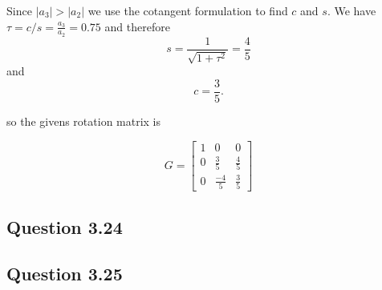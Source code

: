 \documentclass[12pt,a4paper]{report}
\begin{document}
Since $\lvert a_3 \rvert > \lvert a_2 \rvert$ we use the cotangent formulation
to find $c$ and $s$. We have $\tau = c / s = \frac{a_3}{a_2} = 0.75$ and
therefore
$$s = \frac{1}{\sqrt{1+ \tau^2}} =\frac{4}{5}$$
and
$$c = \frac{3}{5}.$$

so the givens rotation matrix is

{\color{blue}
$$G = \begin{bmatrix}
1&0&0\\
0&\frac{3}{5}&\frac{4}{5}\\
0&\frac{-4}{5}&\frac{3}{5}
\end{bmatrix}
$$
}

{\color{red}
\subsection*{Question 3.24}
\subsection*{Question 3.25}
}
\end{document}
